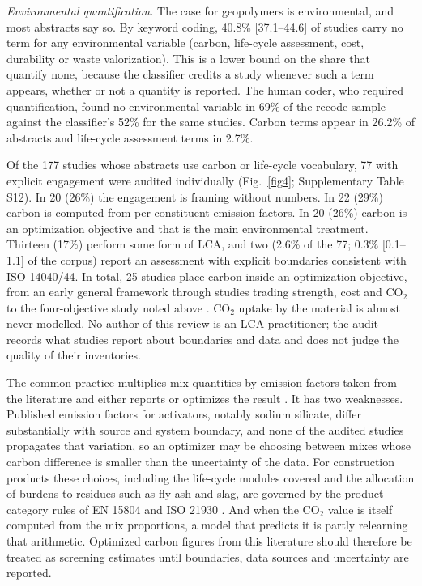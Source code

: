 \documentclass[pdflatex,sn-basic]{sn-jnl}
\begin{document}
\emph{Environmental quantification.} The case for geopolymers is environmental, and most abstracts say so. By keyword coding, 40.8\% [37.1--44.6] of studies carry no term for any environmental variable (carbon, life-cycle assessment, cost, durability or waste valorization). This is a lower bound on the share that quantify none, because the classifier credits a study whenever such a term appears, whether or not a quantity is reported. The human coder, who required quantification, found no environmental variable in 69\% of the recode sample against the classifier's 52\% for the same studies. Carbon terms appear in 26.2\% of abstracts and life-cycle assessment terms in 2.7\%.

Of the 177 studies whose abstracts use carbon or life-cycle vocabulary, 77 with explicit engagement were audited individually (Fig.~\ref{fig4}; Supplementary Table S12). In 20 (26\%) the engagement is framing without numbers. In 22 (29\%) carbon is computed from per-constituent emission factors. In 20 (26\%) carbon is an optimization objective and that is the main environmental treatment. Thirteen (17\%) perform some form of LCA, and two (2.6\% of the 77; 0.3\% [0.1--1.1] of the corpus) report an assessment with explicit boundaries consistent with ISO 14040/44. In total, 25 studies place carbon inside an optimization objective, from an early general framework \citep{shobeiri2022} through studies trading strength, cost and CO$_2$ \citep{huang2023} to the four-objective study noted above \citep{guo2026}. CO$_2$ uptake by the material is almost never modelled. No author of this review is an LCA practitioner; the audit records what studies report about boundaries and data and does not judge the quality of their inventories.

The common practice multiplies mix quantities by emission factors taken from the literature and either reports or optimizes the result \citep{alfakih2024}. It has two weaknesses. Published emission factors for activators, notably sodium silicate, differ substantially with source and system boundary, and none of the audited studies propagates that variation, so an optimizer may be choosing between mixes whose carbon difference is smaller than the uncertainty of the data. For construction products these choices, including the life-cycle modules covered and the allocation of burdens to residues such as fly ash and slag, are governed by the product category rules of EN 15804 and ISO 21930 \citep{en15804,iso21930}. And when the CO$_2$ value is itself computed from the mix proportions, a model that predicts it is partly relearning that arithmetic. Optimized carbon figures from this literature should therefore be treated as screening estimates until boundaries, data sources and uncertainty are reported.
\end{document}
